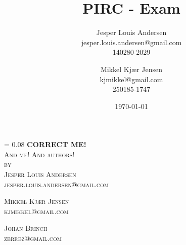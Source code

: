 \documentclass[a4paper, oneside, 10pt, draft]{memoir}
\author{Jesper Louis
  Andersen\\jesper.louis.andersen@gmail.com\\140280-2029
  \and
  Mikkel Kj\ae r Jensen \\ kjmikkel@gmail.com\\250185-1747}
\title{PIRC - Exam}
\date{\today}
\makeatletter
\renewcommand*{\titleM}{\begingroup%
  \drop = 0.08\textheight
  \centering
  {\Huge\bfseries CORRECT ME!}\\[\baselineskip]
  {\scshape And me! And authors!}\\[\baselineskip]
  {\scshape by}\\[\baselineskip]
  {\large\scshape Jesper Louis Andersen\\jesper.louis.andersen@gmail.com}\par
  {\large\scshape Mikkel Kj\ae r Jensen\\kjmikkel@gmail.com}\par
  {\large\scshape Johan Brinch\\zerrez@gmail.com}\par
  \endgroup}
\makeatother
\begin{document}
\titleM







%
%
%

\end{document}
